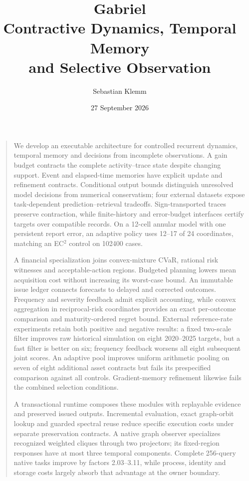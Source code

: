 \documentclass[11pt,a4paper]{article}
\title{\textbf{Gabriel}\\[4pt]\Large Contractive Dynamics, Temporal Memory\\and Selective Observation}
\author{Sebastian Klemm}
\date{27 September 2026}
\renewenvironment{abstract}{\small\begin{center}\bfseries\abstractname\end{center}\begin{quote}\setlength{\parindent}{0pt}\setlength{\parskip}{4pt}}{\end{quote}}
\theoremstyle{definition}\newtheorem{definition}[theorem]{Definition}
\begin{document}
\maketitle
\begin{abstract}
We develop an executable architecture for controlled recurrent dynamics, temporal memory and decisions from incomplete observations. A gain budget contracts the complete activity--trace state despite changing support. Event and elapsed-time memories have explicit update and refinement contracts. Conditional output bounds distinguish unresolved model decisions from numerical conservatism; four external datasets expose task-dependent prediction--retrieval tradeoffs. Sign-transported traces preserve contraction, while finite-history and error-budget interfaces certify targets over compatible records. On a 12-cell annular model with one persistent report error, an adaptive policy uses 12--17 of 24 coordinates, matching an EC$^2$ control on 102400 cases.

A financial specialization joins convex-mixture CVaR, rational risk witnesses and acceptable-action regions. Budgeted planning lowers mean acquisition cost without increasing its worst-case bound. An immutable issue ledger connects forecasts to delayed and corrected outcomes. Frequency and severity feedback admit explicit accounting, while convex aggregation in reciprocal-risk coordinates provides an exact per-outcome comparison and maturity-ordered regret bound. External reference-rate experiments retain both positive and negative results: a fixed two-scale filter improves raw historical simulation on eight 2020--2025 targets, but a fast filter is better on six; frequency feedback worsens all eight subsequent joint scores. An adaptive pool improves uniform arithmetic pooling on seven of eight additional asset contracts but fails its prespecified comparison against all controls. Gradient-memory refinement likewise fails the combined selection conditions.

A transactional runtime composes these modules with replayable evidence and preserved issued outputs. Incremental evaluation, exact graph-orbit lookup and guarded spectral reuse reduce specific execution costs under separate preservation contracts. A native graph observer specializes recognized weighted cliques through two projectors; its fixed-region responses have at most three temporal components. Complete 256-query native tasks improve by factors 2.03--3.11, while process, identity and storage costs largely absorb that advantage at the owner boundary.


\end{abstract}
\end{document}

